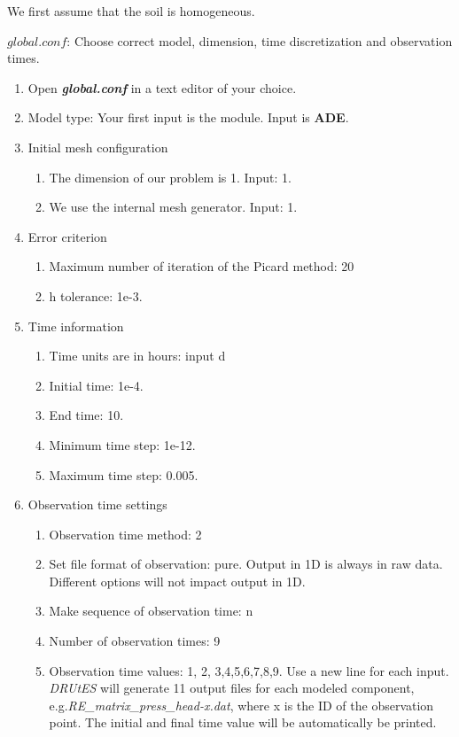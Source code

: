 We first assume that the soil is homogeneous.

$global.conf$: Choose correct model, dimension, time discretization and observation times.
\begin{enumerate}
\item Open \textbf{\emph{global.conf}} in a text editor of your choice. 
\item Model type: Your first input is the module. Input is \textbf{ADE}.
\item Initial mesh configuration \begin{enumerate}
\item The dimension of our problem is 1. Input: 1.
\item We use the internal mesh generator. Input: 1. 
\end{enumerate}
\item Error criterion \begin{enumerate} 
\item Maximum number of iteration of the Picard method: 20 
\item h tolerance: 1e-3.
\end{enumerate}
\item Time information 
\begin{enumerate} 
\item Time units are in hours: input d
\item Initial time: 1e-4.
\item End time: 10.
\item Minimum time step: 1e-12.
\item Maximum time step: 0.005.
\end{enumerate}
\item Observation time settings \begin{enumerate}
\item Observation time method: 2
\item Set file format of observation: pure. Output in 1D is always in raw data. Different options will not impact output in 1D.
\item Make sequence of observation time: n
\item Number of observation times: 9
\item Observation time values: 1, 2, 3,4,5,6,7,8,9. Use a new line for each input. \textit{DRUtES} will generate 11 output files for each modeled component, e.g.\textit{RE\_matrix\_press\_head-x.dat}, where x is the ID of the observation point. The initial and final time value will be automatically be printed.

\end{enumerate}
\end{enumerate}
